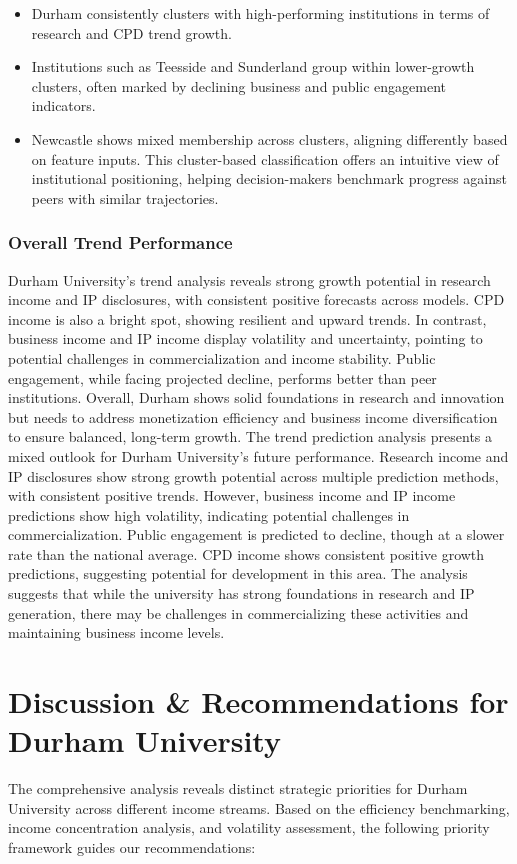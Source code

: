 \documentclass[journal,onecolumn, 10pt,draftclsnofoot]{IEEEtran}
\begin{document}
\begin{itemize}
    \item Durham consistently clusters with high-performing institutions in terms of research and CPD trend growth.
    \item Institutions such as Teesside and Sunderland group within lower-growth clusters, often marked by declining business and public engagement indicators.
    \item Newcastle shows mixed membership across clusters, aligning differently based on feature inputs. This cluster-based classification offers an intuitive view of institutional positioning, helping decision-makers benchmark progress against peers with similar trajectories.
\end{itemize}

\subsubsection{Overall Trend Performance}

Durham University's trend analysis reveals strong growth potential in research income and IP disclosures, with consistent positive forecasts across models. CPD income is also a bright spot, showing resilient and upward trends. In contrast, business income and IP income display volatility and uncertainty, pointing to potential challenges in commercialization and income stability. Public engagement, while facing projected decline, performs better than peer institutions. Overall, Durham shows solid foundations in research and innovation but needs to address monetization efficiency and business income diversification to ensure balanced, long-term growth. The trend prediction analysis presents a mixed outlook for Durham University's future performance. Research income and IP disclosures show strong growth potential across multiple prediction methods, with consistent positive trends. However, business income and IP income predictions show high volatility, indicating potential challenges in commercialization. Public engagement is predicted to decline, though at a slower rate than the national average. CPD income shows consistent positive growth predictions, suggesting potential for development in this area. The analysis suggests that while the university has strong foundations in research and IP generation, there may be challenges in commercializing these activities and maintaining business income levels.

\section{Discussion \& Recommendations for Durham University}
The comprehensive analysis reveals distinct strategic priorities for Durham University across different income streams. Based on the efficiency benchmarking, income concentration analysis, and volatility assessment, the following priority framework guides our recommendations:
\end{document}
